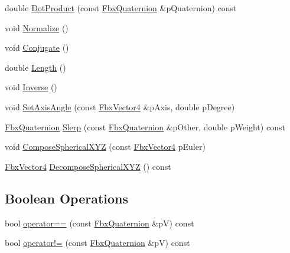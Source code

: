 \begin{DoxyCompactItemize}
\item 
double \hyperlink{class_fbx_quaternion_ad3340e0a9950b818f251ab8ae63e0f9e}{Dot\+Product} (const \hyperlink{class_fbx_quaternion}{Fbx\+Quaternion} \&p\+Quaternion) const
\item 
void \hyperlink{class_fbx_quaternion_a8f7c3917fe374a2b836d58dbc23098f7}{Normalize} ()
\item 
void \hyperlink{class_fbx_quaternion_ab829d078c4d1f24449411f686e64e6f7}{Conjugate} ()
\item 
double \hyperlink{class_fbx_quaternion_a90afe720e7f779480d6cf0af97367a8d}{Length} ()
\item 
void \hyperlink{class_fbx_quaternion_ad7656dae6b9ee5bc42f48a9217dafcbd}{Inverse} ()
\item 
void \hyperlink{class_fbx_quaternion_ad926d8c6abbed994f0474a4144e4f4ea}{Set\+Axis\+Angle} (const \hyperlink{class_fbx_vector4}{Fbx\+Vector4} \&p\+Axis, double p\+Degree)
\item 
\hyperlink{class_fbx_quaternion}{Fbx\+Quaternion} \hyperlink{class_fbx_quaternion_a617ad81c400bdd90745d22ee0b0b42bc}{Slerp} (const \hyperlink{class_fbx_quaternion}{Fbx\+Quaternion} \&p\+Other, double p\+Weight) const
\item 
void \hyperlink{class_fbx_quaternion_a226f76a65db79665179df625f8c57c2d}{Compose\+Spherical\+X\+YZ} (const \hyperlink{class_fbx_vector4}{Fbx\+Vector4} p\+Euler)
\item 
\hyperlink{class_fbx_vector4}{Fbx\+Vector4} \hyperlink{class_fbx_quaternion_a0b58da2306338f4cf167ecfdd745bbb0}{Decompose\+Spherical\+X\+YZ} () const
\end{DoxyCompactItemize}
\subsection*{Boolean Operations}
\begin{DoxyCompactItemize}
\item 
bool \hyperlink{class_fbx_quaternion_a0ae29db12bfc76efa61aaedd39e943fd}{operator==} (const \hyperlink{class_fbx_quaternion}{Fbx\+Quaternion} \&pV) const
\item 
bool \hyperlink{class_fbx_quaternion_a88b6d82c19d53301e7f344271eebb3ac}{operator!=} (const \hyperlink{class_fbx_quaternion}{Fbx\+Quaternion} \&pV) const
\end{DoxyCompactItemize}
